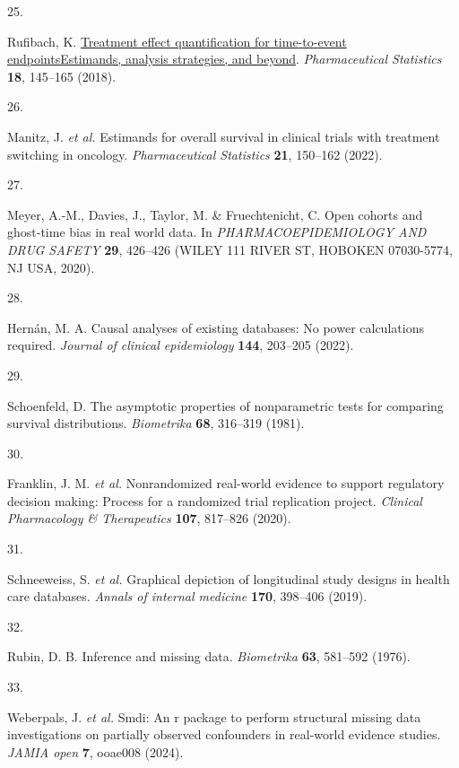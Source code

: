 \documentclass[
  letterpaper,
  DIV=11,
  numbers=noendperiod]{scrartcl}
\newlength{\cslhangindent}
\newlength{\csllabelwidth}
\newenvironment{CSLReferences}[2] %
 {\begin{list}{}{%
  \setlength{\itemindent}{0pt}
  \setlength{\leftmargin}{0pt}
  \setlength{\parsep}{0pt}
  \ifodd #1
   \setlength{\leftmargin}{\cslhangindent}
   \setlength{\itemindent}{-1\cslhangindent}
  \fi
  \setlength{\itemsep}{#2\baselineskip}}}
 {\end{list}}
\newcommand{\CSLLeftMargin}[1]{\parbox[t]{\csllabelwidth}{\strut#1\strut}}
\newcommand{\CSLRightInline}[1]{\parbox[t]{\linewidth - \csllabelwidth}{\strut#1\strut}}
\begin{document}
\begin{CSLReferences}{0}{0}
\CSLLeftMargin{25. }%
\CSLRightInline{Rufibach, K.
\href{https://doi.org/10.1002/pst.1917}{Treatment effect quantification
for time{-}to{-}event endpoints{\textendash}Estimands, analysis
strategies, and beyond}. \emph{Pharmaceutical Statistics} \textbf{18},
145--165 (2018).}

\CSLLeftMargin{26. }%
\CSLRightInline{Manitz, J. \emph{et al.} Estimands for overall survival
in clinical trials with treatment switching in oncology.
\emph{Pharmaceutical Statistics} \textbf{21}, 150--162 (2022).}

\CSLLeftMargin{27. }%
\CSLRightInline{Meyer, A.-M., Davies, J., Taylor, M. \& Fruechtenicht,
C. Open cohorts and ghost-time bias in real world data. In
\emph{PHARMACOEPIDEMIOLOGY AND DRUG SAFETY} \textbf{29}, 426--426 (WILEY
111 RIVER ST, HOBOKEN 07030-5774, NJ USA, 2020).}

\CSLLeftMargin{28. }%
\CSLRightInline{Hernán, M. A. Causal analyses of existing databases: No
power calculations required. \emph{Journal of clinical epidemiology}
\textbf{144}, 203--205 (2022).}

\CSLLeftMargin{29. }%
\CSLRightInline{Schoenfeld, D. The asymptotic properties of
nonparametric tests for comparing survival distributions.
\emph{Biometrika} \textbf{68}, 316--319 (1981).}

\CSLLeftMargin{30. }%
\CSLRightInline{Franklin, J. M. \emph{et al.} Nonrandomized real-world
evidence to support regulatory decision making: Process for a randomized
trial replication project. \emph{Clinical Pharmacology \& Therapeutics}
\textbf{107}, 817--826 (2020).}

\CSLLeftMargin{31. }%
\CSLRightInline{Schneeweiss, S. \emph{et al.} Graphical depiction of
longitudinal study designs in health care databases. \emph{Annals of
internal medicine} \textbf{170}, 398--406 (2019).}

\CSLLeftMargin{32. }%
\CSLRightInline{Rubin, D. B. Inference and missing data.
\emph{Biometrika} \textbf{63}, 581--592 (1976).}

\CSLLeftMargin{33. }%
\CSLRightInline{Weberpals, J. \emph{et al.} Smdi: An r package to
perform structural missing data investigations on partially observed
confounders in real-world evidence studies. \emph{JAMIA open}
\textbf{7}, ooae008 (2024).}


\end{CSLReferences}
\end{document}
